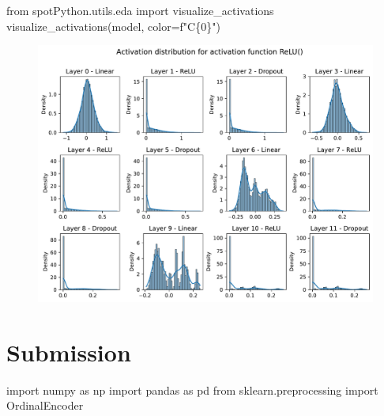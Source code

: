\documentclass[
  letterpaper,
  DIV=11,
  numbers=noendperiod]{scrreprt}
\newenvironment{Shaded}{\begin{snugshade}}{\end{snugshade}}
\newcommand{\DecValTok}[1]{\textcolor[rgb]{0.68,0.00,0.00}{#1}}
\newcommand{\ImportTok}[1]{\textcolor[rgb]{0.00,0.46,0.62}{#1}}
\newcommand{\NormalTok}[1]{\textcolor[rgb]{0.00,0.23,0.31}{#1}}
\newcommand{\OperatorTok}[1]{\textcolor[rgb]{0.37,0.37,0.37}{#1}}
\newcommand{\SpecialCharTok}[1]{\textcolor[rgb]{0.37,0.37,0.37}{#1}}
\newcommand{\SpecialStringTok}[1]{\textcolor[rgb]{0.13,0.47,0.30}{#1}}
\begin{document}
\begin{Shaded}
\begin{Highlighting}[]
\ImportTok{from}\NormalTok{ spotPython.utils.eda }\ImportTok{import}\NormalTok{ visualize\_activations}
\NormalTok{visualize\_activations(model, color}\OperatorTok{=}\SpecialStringTok{f"C}\SpecialCharTok{\{}\DecValTok{0}\SpecialCharTok{\}}\SpecialStringTok{"}\NormalTok{)}
\end{Highlighting}
\end{Shaded}

\begin{figure}[H]

{\centering \includegraphics{31_spot_lightning_csv_files/figure-pdf/cell-25-output-1.pdf}

}

\end{figure}

\hypertarget{submission}{%
\section{Submission}\label{submission}}

\begin{Shaded}
\begin{Highlighting}[]
\ImportTok{import}\NormalTok{ numpy }\ImportTok{as}\NormalTok{ np}
\ImportTok{import}\NormalTok{ pandas }\ImportTok{as}\NormalTok{ pd}
\ImportTok{from}\NormalTok{ sklearn.preprocessing }\ImportTok{import}\NormalTok{ OrdinalEncoder}
\end{Highlighting}
\end{Shaded}
\end{document}
